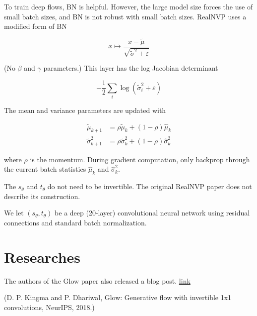 \begin{concept}
    To train deep flows, BN is helpful. However, the large model size forces the use of small batch sizes, and BN is not robust with small batch sizes. RealNVP uses a modified form of BN

    $$
    x \mapsto \frac{x-\tilde{\mu}}{\sqrt{\tilde{\sigma}^{2}+\varepsilon}}
    $$

    (No $\beta$ and $\gamma$ parameters.) This layer has the log Jacobian determinant

    $$
    -\frac{1}{2} \sum_{i} \log \left(\tilde{\sigma}_{i}^{2}+\varepsilon\right)
    $$

    The mean and variance parameters are updated with

    $$
    \begin{aligned}
    \tilde{\mu}_{k+1} & =\rho \tilde{\mu}_{k}+(1-\rho) \hat{\mu}_{k} \\
    \tilde{\sigma}_{k+1}^{2} & =\rho \tilde{\sigma}_{k}^{2}+(1-\rho) \hat{\sigma}_{k}^{2}
    \end{aligned}
    $$

    where $\rho$ is the momentum. During gradient computation, only backprop through the current batch statistics $\hat{\mu}_{k}$ and $\hat{\sigma}_{k}^{2}$.
\end{concept}

\begin{concept}
    The $s_{\theta}$ and $t_{\theta}$ do not need to be invertible. The original RealNVP paper does not describe its construction.

    We let $\left(s_{\theta}, t_{\theta}\right)$ be a deep (20-layer) convolutional neural network using residual connections and standard batch normalization.
\end{concept}

\section{Researches}

\begin{definition}
    The authors of the Glow paper also released a blog post.
    \href{https://openai.com/blog/glow/}{link}

    (D. P. Kingma and P. Dhariwal, Glow: Generative flow with invertible 1x1 convolutions, NeurIPS, 2018.)
\end{definition}

